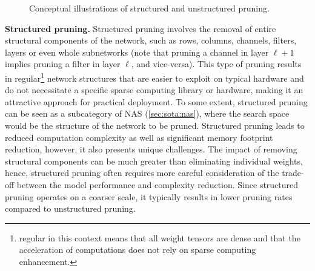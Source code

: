 \begin{figure}
  \centering
  \hspace{0.09\textwidth}
  \caption{Conceptual illustrations of structured and unstructured pruning.}
  \label{fig:sota:pruning}
\end{figure}

\noindent\textbf{Structured pruning.} Structured pruning involves the removal of
entire structural components of the network, such as rows, columns, channels,
filters, layers or even whole subnetworks (note that pruning a channel in layer
$\ell+1$ implies pruning a filter in layer $\ell$, and vice-versa). This type of
pruning results in regular\footnote{regular in this context means that all
weight tensors are dense and that the acceleration of computations does not rely
on sparse computing enhancement.} network structures that are easier to exploit
on typical hardware and do not necessitate a specific sparse computing library
or hardware, making it an attractive approach for practical deployment. To some
extent, structured pruning can be seen as a subcategory of \acl{NAS}
(\cref{sec:sota:nas}), where the search space would be the structure of the
network to be pruned. Structured pruning leads to reduced computation complexity
as well as significant memory footprint reduction, however, it also presents
unique challenges. The impact of removing structural components can be much
greater than eliminating individual weights, hence, structured pruning often
requires more careful consideration of the trade-off between the model
performance and complexity reduction. Since structured pruning operates on a
coarser scale, it typically results in lower pruning rates compared to
unstructured pruning.\\


